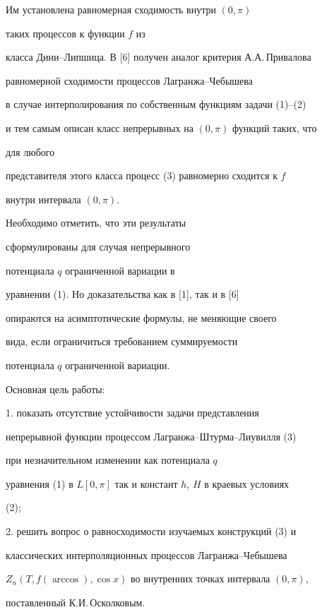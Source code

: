 Им установлена равномерная сходимость внутри $(0,\pi)$ 


таких процессов к функции $f$ из 


класса Дини--Липшица. В [6] получен аналог критерия А.А.\,Привалова 


равномерной сходимости процессов Лагранжа--Чебышева 


в случае интерполирования по собственным функциям задачи (1)--(2) 


и тем самым описан класс непрерывных на $(0,\pi)$ функций таких, что 


для любого 


представителя этого класса процесс (3) равномерно сходится к $f$ 


внутри интервала $(0,\pi)$. 


Необходимо отметить, что эти результаты 


сформулированы для случая непрерывного 


потенциала $q$ ограниченной вариации в 


уравнении (1). Но доказательства как в [1], так и в [6] 


опираются на асимптотические формулы, не меняющие своего 


вида, если ограничиться требованием суммируемости 


потенциала $q$ ограниченной вариации. 


 


Основная цель работы:


 


1. показать отсутствие устойчивости задачи представления 


непрерывной функции процессом Лагранжа--Штурма--Лиувилля (3) 


при незначительном изменении как потенциала $q$ 


уравнения (1) в $L[0,\pi]$ так и констант $h$, $H$ в краевых условиях 


(2); 


 


2. решить вопрос о равносходимости изучаемых конструкций (3) и 


классических интерполяционных процессов Лагранжа--Чебышева 


$Z_n(T,f(\arccos),\cos x)$ во внутренних точках интервала $(0,\pi)$, 


поставленный К.И.\,Осколковым. 


